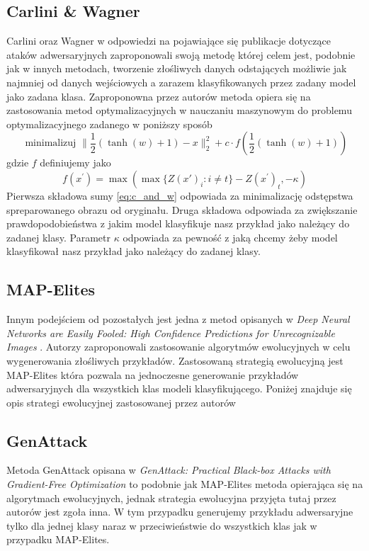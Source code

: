 \documentclass[
    left=2.5cm,         %
    right=2.5cm,        %
    top=2.5cm,          %
    bottom=3cm,         %
    bindingoffset=6mm,  %
    nohyphenation=false %
]{eiti/eiti-thesis}
\begin{document}
\subsection{Carlini \& Wagner}
Carlini oraz Wagner\cite{DBLP:journals/corr/CarliniW16a} w odpowiedzi na pojawiające się publikacje dotyczące
ataków adwersaryjnych zaproponowali swoją metodę której celem jest, podobnie jak w innych metodach,
tworzenie złośliwych danych
odstających możliwie jak najmniej od danych wejściowych a zarazem klasyfikowanych przez zadany model jako
zadana klasa. Zaproponowna przez autorów metoda opiera się na zastosowania metod optymalizacyjnych  w nauczaniu
maszynowym do problemu optymalizacyjnego zadanego w poniższy sposób
\begin{equation}\label{eq:c_and_w}
    \text { minimalizuj } \| \frac { 1 } { 2 } ( \tanh ( w ) + 1 ) - x \| _ { 2 } ^ { 2 } + c \cdot f ( \frac { 1 } { 2 } ( \tanh ( w ) + 1 ) )
\end{equation}
gdzie $f$ definiujemy jako
\begin{equation}
    f ( x ^ { \prime } ) = \max ( \max \{ Z ( x' ) _ { i } : i \neq t \} - Z ( x ^ { \prime } ) _ { t } , - \kappa)
\end{equation}
Pierwsza składowa sumy \eqref{eq:c_and_w} odpowiada za minimalizację odstępstwa spreparowanego obrazu
od oryginału. Druga składowa odpowiada za zwiększanie prawdopodobieństwa z jakim model klasyfikuje nasz przykład
jako należący do zadanej klasy. Parametr \(\kappa\) odpowiada za pewność z jaką chcemy żeby model klasyfikował nasz
przykład jako należący do zadanej klasy.


\subsection{MAP-Elites}
Innym podejściem od pozostałych jest jedna z metod opisanych w
\textit{Deep Neural Networks are Easily Fooled: High Confidence Predictions for Unrecognizable Images} \cite{DBLP:journals/corr/NguyenYC14}.
Autorzy zaproponowali zastosowanie algorytmów ewolucyjnych w celu wygenerowania złośliwych przykładów.
Zastosowaną strategią ewolucyjną jest MAP-Elites która pozwala na jednoczesne generowanie przykładów adwersaryjnych dla
wszystkich klas modeli klasyfikującego. Poniżej znajduje się opis strategi ewolucyjnej zastosowanej przez autorów

\subsection{GenAttack}
Metoda GenAttack opisana w
\textit{GenAttack: Practical Black-box Attacks with Gradient-Free Optimization}\cite{DBLP:journals/corr/abs-1805-11090}
to podobnie jak MAP-Elites metoda opierająca się na algorytmach ewolucyjnych, jednak strategia ewolucyjna
przyjęta tutaj przez autorów jest zgoła inna. W tym przypadku generujemy przykładu adwersaryjne tylko dla jednej klasy naraz
w przeciwieństwie do wszystkich klas jak w przypadku MAP-Elites.
\end{document}
